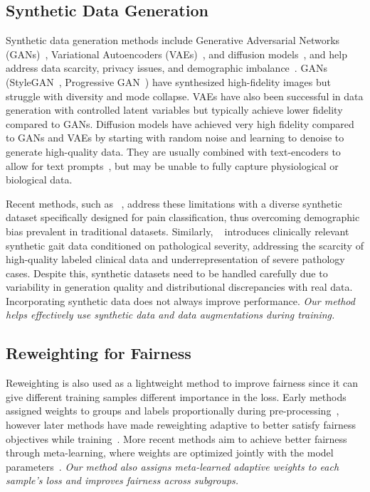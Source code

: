 \documentclass{article}
\theoremstyle{plain}
\theoremstyle{definition}
\theoremstyle{remark}
\begin{document}
\subsection{Synthetic Data Generation}
Synthetic data generation methods include Generative Adversarial Networks (GANs)~\citep{gan}, Variational Autoencoders (VAEs)~\citep{vae}, and diffusion models~\citep{diffusion}, and help address data scarcity, privacy issues, and demographic imbalance~\citep{bauer2024comprehensive}. GANs (StyleGAN~\citep{stylegan1,stylegan2}, Progressive GAN~\citep{pggan}) have synthesized high-fidelity images but struggle with diversity and mode collapse. VAEs have also been successful in data generation with controlled latent variables but typically achieve lower fidelity compared to GANs. Diffusion models have achieved very high fidelity compared to GANs and VAEs by starting with random noise and learning to denoise to generate high-quality data. They are usually combined with text-encoders to allow for text prompts~\cite{zhang2024texttoimagediffusionmodelsgenerative}, but may be unable to fully capture physiological or biological data.

Recent methods, such as \synpain~\cite{taati2025synpain}, address these limitations with a diverse synthetic dataset specifically designed for pain classification, thus overcoming demographic bias prevalent in traditional datasets. Similarly, \gaitgen~\cite{adeli2025gaitgen} introduces clinically relevant synthetic gait data conditioned on pathological severity, addressing the scarcity of high-quality labeled clinical data and underrepresentation of severe pathology cases. Despite this, synthetic datasets need to be handled carefully due to variability in generation quality and distributional discrepancies with real data. Incorporating synthetic data does not always improve performance. \textit{Our method helps effectively use synthetic data and data augmentations during training.} %

\subsection{Reweighting for Fairness}

Reweighting is also used as a lightweight method to improve fairness since it can give different training samples different importance in the loss. Early methods assigned weights to groups and labels proportionally during pre-processing~\citep{kamiran}, however later methods have made reweighting adaptive to better satisfy fairness objectives while training~\citep{krasanakis, chai}. More recent methods aim to achieve better fairness through meta-learning, where weights are optimized jointly with the model parameters~\citep{yan2020forml}. \textit{Our method also assigns meta-learned adaptive weights to each sample's loss and improves fairness across subgroups.}
\end{document}
